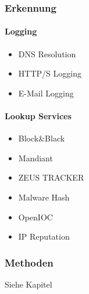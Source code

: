 \subsubsection{Erkennung}
\paragraph{Logging}
\begin{itemize}
  \item DNS Resolution
  \item HTTP/S Logging
  \item E-Mail Logging
\end{itemize}

\paragraph{Lookup Services}
\begin{itemize}
  \item Block\&Black
  \item Mandiant
  \item ZEUS TRACKER
  \item Malware Hash
  \item OpenIOC
  \item IP Reputation
\end{itemize}

\subsubsection{Methoden}
Siehe Kapitel %